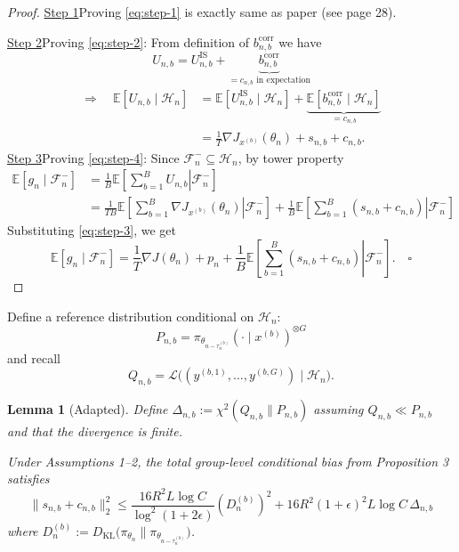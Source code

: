 \documentclass[10pt]{article}
\newcommand{\E}{\mathbb{E}}
\newcommand{\F}{\mathcal{F}}
\newcommand{\Hh}{\mathcal{H}}
\newcommand{\KL}{D_{\mathrm{KL}}}
\newcommand{\grad}{\nabla}
\theoremstyle{preserved}
\newtheorem{lemma}{Lemma}
\begin{document}
\begin{proof} \underline{Step 1}\quad Proving \eqref{eq:step-1} is exactly same as paper (see page 28).

\underline{Step 2}\quad Proving \eqref{eq:step-2}: From definition of $b_{n,b}^{\mathrm{corr}}$ we have
\begin{equation*}
U_{n,b}=U_{n,b}^{\mathrm{IS}}+\underbrace{b_{n,b}^{\mathrm{corr}}}_{=c_{n,b}\text{ in expectation}}
\end{equation*}
\begin{equation*}
\begin{aligned}
\Rightarrow\quad\E[U_{n,b}\mid\Hh_n]&=\E[U_{n,b}^{\mathrm{IS}}\mid\Hh_n]+\underbrace{\E[b_{n,b}^{\mathrm{corr}}\mid\Hh_n]}_{=c_{n,b}}\\
&=\frac1T\grad J_{x^{(b)}}(\theta_n)+s_{n,b}+c_{n,b}.
\end{aligned}
\end{equation*}
\underline{Step 3}\quad Proving \eqref{eq:step-4}: Since $\F_n^-\subseteq\Hh_n$, by tower property
\begin{equation*}
\begin{aligned}
\E[g_n\mid\F_n^-]
&=\frac1B\E\left[\left.\sum_{b=1}^B U_{n,b}\right|\F_n^-\right]\\
&=\frac{1}{TB}\E\left[\left.\sum_{b=1}^B\grad J_{x^{(b)}}(\theta_n)\right|\F_n^-\right]
+\frac1B\E\left[\left.\sum_{b=1}^B(s_{n,b}+c_{n,b})\right|\F_n^-\right]
\end{aligned}
\end{equation*}
Substituting \eqref{eq:step-3}, we get
\begin{equation*}
\E[g_n\mid\F_n^-]=\frac1T\grad J(\theta_n)+p_n+\frac1B\E\left[\left.\sum_{b=1}^B(s_{n,b}+c_{n,b})\right|\F_n^-\right].\quad\square
\end{equation*}

\end{proof}

Define a reference distribution conditional on $\Hh_n$:
\begin{equation*}
P_{n,b}=\pi_{\theta_{n-\tau_n^{(b)}}}(\cdot\mid x^{(b)})^{\otimes G}
\end{equation*}
and recall
\begin{equation*}
Q_{n,b}=\mathcal L\bigl((y^{(b,1)},\ldots,y^{(b,G)})\mid\Hh_n\bigr).
\end{equation*}

\setcounter{lemma}{5}
\begin{lemma}[Adapted] Define $\Delta_{n,b}:=\chi^2(Q_{n,b}\|P_{n,b})$ assuming $Q_{n,b}\ll P_{n,b}$ and that the divergence is finite.

Under Assumptions 1--2, the total group-level conditional bias from Proposition 3 satisfies
\begin{equation*}
\|s_{n,b}+c_{n,b}\|_2^2\le
\frac{16R^2L\log C}{\log^2(1+2\epsilon)}(D_n^{(b)})^2
+16R^2(1+\epsilon)^2L\log C\,\Delta_{n,b}
\end{equation*}
where $D_n^{(b)}:=\KL\bigl(\pi_{\theta_n}\|\pi_{\theta_{n-\tau_n^{(b)}}}\bigr)$.

\end{lemma}
\end{document}

